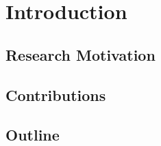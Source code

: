 \chapter{Introduction}
\label{ch:introduction}
\blindtext

\section{Research Motivation}
\blindtext

\section{Contributions}
\blindtext
\blinditemize


\section{Outline}
\blindtext
